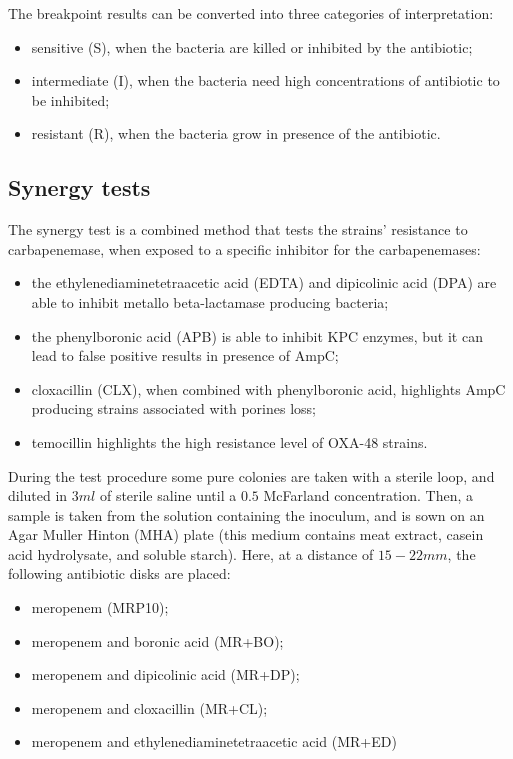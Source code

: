 \documentclass[11pt]{report}
\begin{document}
The breakpoint results can be converted into three categories of interpretation:
\begin{itemize}
\item sensitive (S), when the bacteria are killed or inhibited by the antibiotic;
\item intermediate (I), when the bacteria need high concentrations of antibiotic to be inhibited;
\item resistant (R), when the bacteria grow in presence of the antibiotic.
\end{itemize}

\subsection{Synergy tests}
The synergy test is a combined method that tests the strains' resistance to carbapenemase, when exposed to a specific inhibitor for the carbapenemases:
\begin{itemize}
\item the ethylenediaminetetraacetic acid (EDTA) and dipicolinic acid (DPA) are able to inhibit metallo beta-lactamase producing bacteria;
\item the phenylboronic acid (APB) is able to inhibit KPC enzymes, but it can lead to false positive results in presence of AmpC;
\item cloxacillin (CLX), when combined with phenylboronic acid, highlights AmpC producing strains associated with porines loss;
\item temocillin highlights the high resistance level of OXA-48 strains.
\end{itemize}

During the test procedure some pure colonies are taken with a sterile loop, and diluted in $3ml$ of sterile saline until a $0.5$ McFarland concentration.
Then, a sample is taken from the solution containing the inoculum, and is sown on an Agar Muller Hinton (MHA) plate (this medium contains meat extract, casein acid hydrolysate, and soluble starch). Here, at a distance of $15-22 mm$, the following antibiotic disks are placed:
\begin{itemize}
\item meropenem (MRP10);
\item meropenem and boronic acid (MR+BO);
\item meropenem and dipicolinic acid (MR+DP);
\item meropenem and cloxacillin (MR+CL);
\item meropenem and ethylenediaminetetraacetic acid (MR+ED)
\end{itemize}
\end{document}
